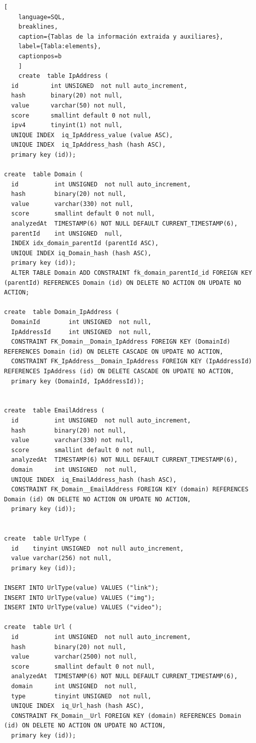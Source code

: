 \begin{lstlisting}[
    language=SQL,
    breaklines, 
    caption={Tablas de la información extraida y auxiliares}, 
    label={Tabla:elements}, 
    captionpos=b
    ]
    create  table IpAddress (
  id         int UNSIGNED  not null auto_increment, 
  hash       binary(20) not null, 
  value      varchar(50) not null, 
  score      smallint default 0 not null, 
  ipv4       tinyint(1) not null, 
  UNIQUE INDEX  iq_IpAddress_value (value ASC),
  UNIQUE INDEX  iq_IpAddress_hash (hash ASC),
  primary key (id));

create  table Domain (
  id          int UNSIGNED  not null auto_increment, 
  hash        binary(20) not null, 
  value       varchar(330) not null, 
  score       smallint default 0 not null, 
  analyzedAt  TIMESTAMP(6) NOT NULL DEFAULT CURRENT_TIMESTAMP(6),
  parentId    int UNSIGNED  null, 
  INDEX idx_domain_parentId (parentId ASC),
  UNIQUE INDEX iq_Domain_hash (hash ASC),
  primary key (id));
  ALTER TABLE Domain ADD CONSTRAINT fk_domain_parentId_id FOREIGN KEY (parentId) REFERENCES Domain (id) ON DELETE NO ACTION ON UPDATE NO ACTION;

create  table Domain_IpAddress (
  DomainId        int UNSIGNED  not null, 
  IpAddressId     int UNSIGNED  not null,
  CONSTRAINT FK_Domain__Domain_IpAddress FOREIGN KEY (DomainId) REFERENCES Domain (id) ON DELETE CASCADE ON UPDATE NO ACTION,
  CONSTRAINT FK_IpAddress__Domain_IpAddress FOREIGN KEY (IpAddressId) REFERENCES IpAddress (id) ON DELETE CASCADE ON UPDATE NO ACTION,
  primary key (DomainId, IpAddressId));


create  table EmailAddress (
  id          int UNSIGNED  not null auto_increment, 
  hash        binary(20) not null, 
  value       varchar(330) not null, 
  score       smallint default 0 not null, 
  analyzedAt  TIMESTAMP(6) NOT NULL DEFAULT CURRENT_TIMESTAMP(6),
  domain      int UNSIGNED  not null, 
  UNIQUE INDEX  iq_EmailAddress_hash (hash ASC),
  CONSTRAINT FK_Domain__EmailAddress FOREIGN KEY (domain) REFERENCES Domain (id) ON DELETE NO ACTION ON UPDATE NO ACTION,
  primary key (id));


create  table UrlType (
  id    tinyint UNSIGNED  not null auto_increment, 
  value varchar(256) not null, 
  primary key (id));

INSERT INTO UrlType(value) VALUES ("link");
INSERT INTO UrlType(value) VALUES ("img");
INSERT INTO UrlType(value) VALUES ("video");

create  table Url (
  id          int UNSIGNED  not null auto_increment, 
  hash        binary(20) not null, 
  value       varchar(2500) not null, 
  score       smallint default 0 not null, 
  analyzedAt  TIMESTAMP(6) NOT NULL DEFAULT CURRENT_TIMESTAMP(6),
  domain      int UNSIGNED  not null, 
  type        tinyint UNSIGNED  not null, 
  UNIQUE INDEX  iq_Url_hash (hash ASC),
  CONSTRAINT FK_Domain__Url FOREIGN KEY (domain) REFERENCES Domain (id) ON DELETE NO ACTION ON UPDATE NO ACTION,
  primary key (id));


\end{lstlisting}
